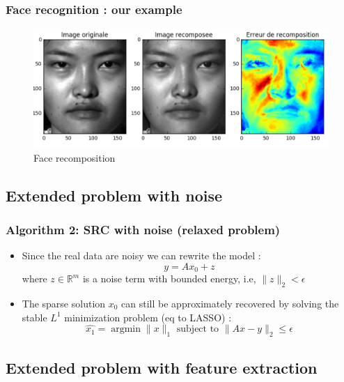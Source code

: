 \documentclass{beamer}
\DeclareMathOperator{\argmin}{argmin} %
\begin{document}

\begin{frame}
\frametitle{Face recognition : our example}

			\begin{figure}[!ht]
			\begin{center}
			\includegraphics[scale=0.4]{recomposition.png}
			\end{center}
			\caption{Face recomposition}
			\label{fa}
			\end{figure}
\end{frame}



\subsection{Extended problem with noise}


\begin{frame}

		\frametitle{Algorithm 2: SRC with noise (relaxed problem)}		

\begin{itemize}			
\item Since the real data are noisy we can rewrite the model : 
$$ y=Ax_{0}+z$$
where $z \in  \mathbb{R}^{m}$ is a noise term with bounded energy, i.e, $\|z\|_{2}< \epsilon$
\item The sparse solution $x_{0}$ can still be approximately recovered by solving the stable $L^{1}$ minimization problem (eq to LASSO) :
$$ \hat{x_{1}}= \argmin \|x\|_{1}  \mbox{ subject to } \|Ax-y\|_{2} \leq \epsilon $$
\end{itemize}
\end{frame}




\subsection{Extended problem with feature extraction}
\end{document}
